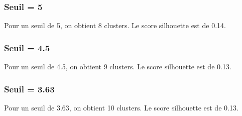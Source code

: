 \documentclass{article}
\begin{document}
\subsubsection*{Seuil = 5}
Pour un seuil de 5, on obtient 8 clusters. Le score silhouette est de 0.14.

\subsubsection*{Seuil = 4.5}
Pour un seuil de 4.5, on obtient 9 clusters. Le score silhouette est de 0.13.

\subsubsection*{Seuil = 3.63}
Pour un seuil de 3.63, on obtient 10 clusters. Le score silhouette est de 0.13.
\end{document}
